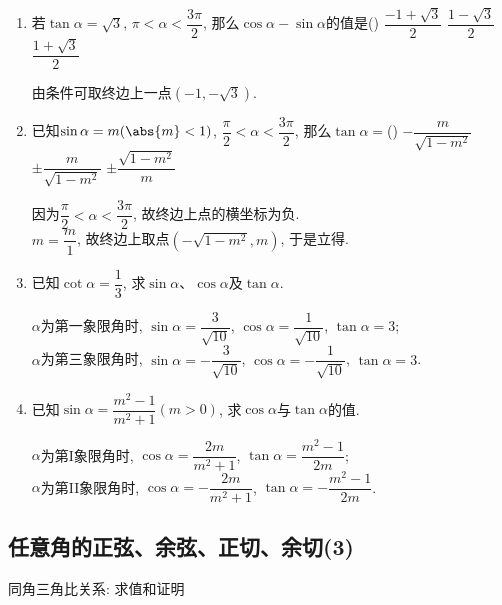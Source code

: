 \begin{enumerate}
\item 若$\tan\alpha=\sqrt3$, $\pi<\alpha<\dfrac{3\pi}{2}$, 那么$\cos\alpha-\sin\alpha$的值是\dotfill()
{$\dfrac{-1+\sqrt3}{2}$}
{$\dfrac{1-\sqrt3}{2}$}
{$\dfrac{1+\sqrt3}{2}$}
\begin{jieda}
由条件可取终边上一点$(-1,-\sqrt{3})$. 
\end{jieda}

\item 已知$\sin\alpha=m(\abs{m}<1)$, $\dfrac{\pi}{2}<\alpha<\dfrac{3\pi}{2}$, 那么$\tan\alpha=$\dotfill()
{$-\dfrac{m}{\sqrt{1-m^2}}$}
{$\pm\dfrac{m}{\sqrt{1-m^2}}$}
{$\pm\dfrac{\sqrt{1-m^2}}{m}$}
\begin{jieda}
因为$\dfrac{\pi}{2}<\alpha<\dfrac{3\pi}{2}$, 故终边上点的横坐标为负. \\
$m=\dfrac{m}{1}$, 故终边上取点$(-\sqrt{1-m^2},m)$, 于是立得. 
\end{jieda}

\item 已知$\cot\alpha=\dfrac{1}{3}$, 求$\sin\alpha$、$\cos\alpha$及$\tan\alpha$. 
\begin{jieda}
$\alpha$为第一象限角时, $\sin\alpha=\dfrac{3}{\sqrt{10}}$, $\cos\alpha=\dfrac{1}{\sqrt{10}}$, $\tan\alpha=3$; \\
$\alpha$为第三象限角时, $\sin\alpha=-\dfrac{3}{\sqrt{10}}$, $\cos\alpha=-\dfrac{1}{\sqrt{10}}$, $\tan\alpha=3$. 
\end{jieda}

\item 已知$\sin\alpha=\dfrac{m^2-1}{m^2+1}(m>0)$, 求$\cos\alpha$与$\tan\alpha$的值. 
\begin{jieda}
$\alpha$为第I象限角时, $\cos\alpha=\dfrac{2m}{m^2+1}$, $\tan\alpha=\dfrac{m^2-1}{2m}$; \\
$\alpha$为第II象限角时, $\cos\alpha=-\dfrac{2m}{m^2+1}$, $\tan\alpha=-\dfrac{m^2-1}{2m}$. 
\end{jieda}
\end{enumerate}







\subsection{任意角的正弦、余弦、正切、余切(3)}
\zsd 同角三角比关系: 求值和证明

